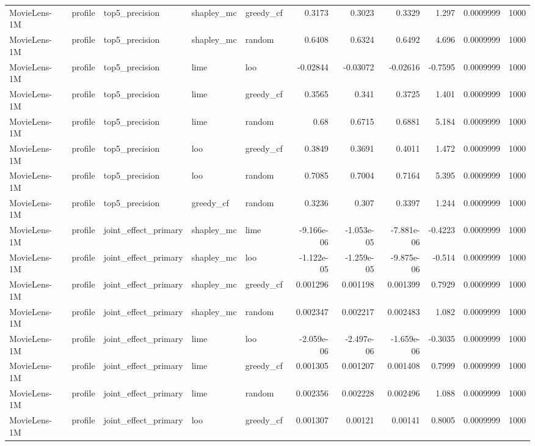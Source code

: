 \begin{table}[t]
\begin{tabular}{lllllrrrrrr}
MovieLens-1M & profile & top5\_precision & shapley\_mc & greedy\_cf & 0.3173 & 0.3023 & 0.3329 & 1.297 & 0.0009999 & 1000 \\
MovieLens-1M & profile & top5\_precision & shapley\_mc & random & 0.6408 & 0.6324 & 0.6492 & 4.696 & 0.0009999 & 1000 \\
MovieLens-1M & profile & top5\_precision & lime & loo & -0.02844 & -0.03072 & -0.02616 & -0.7595 & 0.0009999 & 1000 \\
MovieLens-1M & profile & top5\_precision & lime & greedy\_cf & 0.3565 & 0.341 & 0.3725 & 1.401 & 0.0009999 & 1000 \\
MovieLens-1M & profile & top5\_precision & lime & random & 0.68 & 0.6715 & 0.6881 & 5.184 & 0.0009999 & 1000 \\
MovieLens-1M & profile & top5\_precision & loo & greedy\_cf & 0.3849 & 0.3691 & 0.4011 & 1.472 & 0.0009999 & 1000 \\
MovieLens-1M & profile & top5\_precision & loo & random & 0.7085 & 0.7004 & 0.7164 & 5.395 & 0.0009999 & 1000 \\
MovieLens-1M & profile & top5\_precision & greedy\_cf & random & 0.3236 & 0.307 & 0.3397 & 1.244 & 0.0009999 & 1000 \\
MovieLens-1M & profile & joint\_effect\_primary & shapley\_mc & lime & -9.166e-06 & -1.053e-05 & -7.881e-06 & -0.4223 & 0.0009999 & 1000 \\
MovieLens-1M & profile & joint\_effect\_primary & shapley\_mc & loo & -1.122e-05 & -1.259e-05 & -9.875e-06 & -0.514 & 0.0009999 & 1000 \\
MovieLens-1M & profile & joint\_effect\_primary & shapley\_mc & greedy\_cf & 0.001296 & 0.001198 & 0.001399 & 0.7929 & 0.0009999 & 1000 \\
MovieLens-1M & profile & joint\_effect\_primary & shapley\_mc & random & 0.002347 & 0.002217 & 0.002483 & 1.082 & 0.0009999 & 1000 \\
MovieLens-1M & profile & joint\_effect\_primary & lime & loo & -2.059e-06 & -2.497e-06 & -1.659e-06 & -0.3035 & 0.0009999 & 1000 \\
MovieLens-1M & profile & joint\_effect\_primary & lime & greedy\_cf & 0.001305 & 0.001207 & 0.001408 & 0.7999 & 0.0009999 & 1000 \\
MovieLens-1M & profile & joint\_effect\_primary & lime & random & 0.002356 & 0.002228 & 0.002496 & 1.088 & 0.0009999 & 1000 \\
MovieLens-1M & profile & joint\_effect\_primary & loo & greedy\_cf & 0.001307 & 0.00121 & 0.00141 & 0.8005 & 0.0009999 & 1000 \\

\end{tabular}
\end{table}
